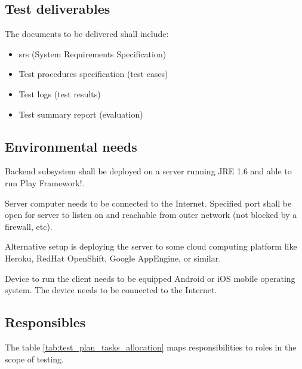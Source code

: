 \documentclass[11pt]{book}
\begin{document}

\subsection{Test deliverables}
The documents to be delivered shall include:

\begin{itemize}
    \item \gls{srs} (System Requirements Specification)
    \item Test procedures specification (test cases)
    \item Test logs (test results)
    \item Test summary report (evaluation)
\end{itemize}

\subsection{Environmental needs}
Backend subsystem shall be deployed on a server running JRE 1.6 and able to run Play Framework!.

Server computer needs to be connected to the Internet. Specified port shall be open for server to listen on and reachable from outer network (not blocked by a firewall, etc).

Alternative setup is deploying the server to some cloud computing platform like Heroku, RedHat OpenShift, Google AppEngine, or similar. 

Device to run the client needs to be equipped Android or iOS mobile operating system. The device needs to be connected to the Internet.

\subsection{Responsibles}

The table \ref{tab:test_plan_tasks_allocation} maps responsibilities to roles in the scope of testing.
\end{document}
